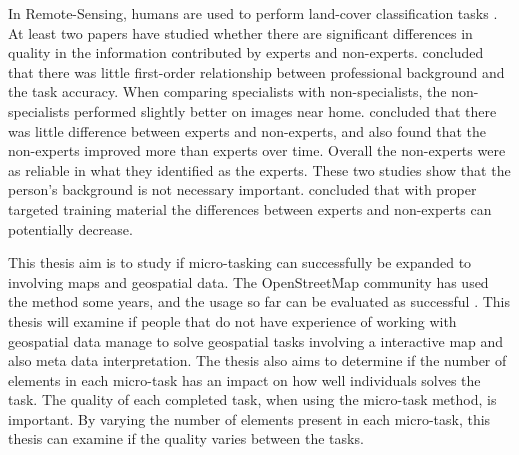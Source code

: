 In Remote-Sensing, humans are used to perform land-cover classification tasks \citep{Salk2016}. At least two papers have studied whether there are significant differences in quality in the information contributed by experts and non-experts.
\cite{Salk2016} concluded that there was little first-order relationship between professional background and the task accuracy.
When comparing specialists with non-specialists, the non-specialists performed slightly better on images near home. 
\cite{See2013} concluded that there was little difference between experts and non-experts, and also found that the non-experts improved more than experts over time. Overall the non-experts were as reliable in what they identified as the experts. These two studies show that the person's background is not necessary important. \cite{See2013} concluded that with proper targeted training material the differences between experts and non-experts can potentially decrease.   

This thesis aim is to study if micro-tasking can successfully be expanded to involving maps and geospatial data. The OpenStreetMap community has used the method some years, and the usage so far can be evaluated as successful \citep{Erichsen2016}. This thesis will examine if people that do not have experience of working with geospatial data manage to solve geospatial tasks involving a interactive map and also meta data interpretation. The thesis also aims to determine if the number of elements in each micro-task has an impact on how well individuals solves the task. The quality of each completed task, when using the micro-task method, is important. By varying the number of elements present in each micro-task, this thesis can examine if the quality varies between the tasks. 

